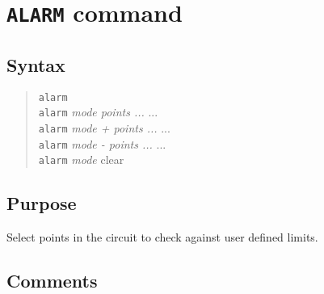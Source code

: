 %
%
%
%
\section{{\tt ALARM} command}
\subsection{Syntax}
\begin{verse}
{\tt alarm}\\
{\tt alarm} {\it mode points ...} ...\\
{\tt alarm} {\it mode + points ...} ...\\
{\tt alarm} {\it mode - points ...} ...\\
{\tt alarm} {\it mode} clear
\end{verse}
\subsection{Purpose}

Select points in the circuit to check against user defined limits.
\subsection{Comments}

